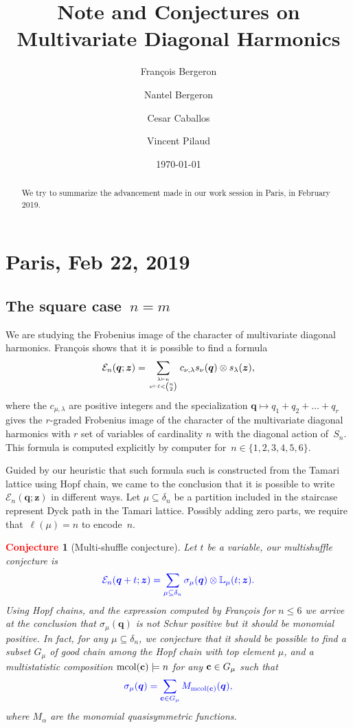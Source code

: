 \documentclass[12pt]{amsart}
\date{\today}
\author{Fran\c{c}ois Bergeron}
\author{Nantel Bergeron}\address[Bergeron]
\author{Cesar Caballos}
\author{Vincent Pilaud}
\title[Note and Conjectures on Multivariate Diagonal Harmonics]{Note and Conjectures on \\ Multivariate Diagonal Harmonics}
\newcommand{\blue}[1]{\textcolor{blue}{#1}}
\newcommand{\red}[1]{\textcolor{red}{#1}}
\theoremstyle{plain}
\newtheorem{conjecture}{\red{Conjecture}}
\theoremstyle{definition}
\theoremstyle{remark}
\newcommand{\Qvar}{{\bm q}}
\newcommand{\Zvar}{{\bm z}}
\begin{document}
\begin{abstract}
We try to summarize the advancement made in our work session in Paris, in February 2019.
\end{abstract}

\maketitle

\section{Paris, Feb 22, 2019}

\subsection{The square case~$n = m$}
We are studying the Frobenius image of the character of multivariate diagonal harmonics. Fran\c{c}ois shows that it is possible to find a formula
{\begin{equation}\label{eq:En}
{\mathcal E}_n(\Qvar;\Zvar) = \sum_{\lambda \vdash n \atop \nu \vdash \ell<{n\choose 2}} c_{\nu,\lambda} s_\nu(\Qvar) \otimes s_\lambda(\Zvar),
\end{equation}}
where the $c_{\mu,\lambda}$ are positive integers and the specialization $\Qvar \mapsto q_1 + q_2 + \dots + q_r$ gives the $r$-graded Frobenius image of the character of the multivariate diagonal harmonics with $r$ set of variables of cardinality $n$ with the diagonal action of~$S_n$.
This formula is computed explicitly by computer for~$n \in \{1,2,3,4,5,6\}$.

Guided by our heuristic that such formula such is constructed from the Tamari lattice using Hopf chain, we came to the conclusion that it is possible to write~${\mathcal E}_n(\Qvar;\Zvar)$ in different ways.
Let $\mu\subseteq\delta_n$ be a partition included in the staircase represent Dyck path in the Tamari lattice.
Possibly adding zero parts, we require that~$\ell(\mu) = n$ to encode~$n$.

\begin{conjecture}[Multi-shuffle conjecture]\label{conj:master}
Let $t$ be a variable, our multishuffle conjecture is
\begin{equation}\label{eq:multishuff}
\blue{
{\mathcal E}_n(\Qvar+t;\Zvar) = \sum_{\mu\subseteq\delta_n} \sigma_{\mu}(\Qvar) \otimes {\mathbb L}_{\mu}(t;\Zvar).
}
\end{equation}
Using Hopf chains, and the expression computed by Fran\c{c}ois for $n\le 6$ we arrive at the conclusion that $\sigma_{\mu}(\Qvar)$ is not Schur positive but it should be monomial positive.
In fact, for any $\mu\subseteq\delta_n$, we conjecture that it should be possible to find a subset $G_\mu$ of good chain among the Hopf chain with top element $\mu$, and a multistatistic composition ${\mathrm{mcol}}({\bf c})\models n$ for any ${\bf c}\in G_\mu$ such that
\begin{equation}\label{eq:chainstat}
\blue{
\sigma_\mu(\Qvar) = \sum_{{\bf c} \in G_\mu} M_{{\mathrm{mcol}}({\bf c})}(\Qvar),
}
\end{equation}
where $M_\alpha$ are the monomial quasisymmetric functions.
\end{conjecture}
\end{document}
